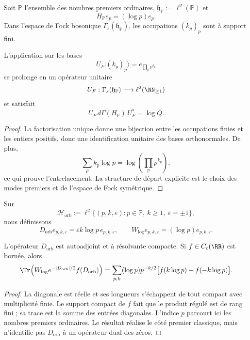 Soit \(\mathbb P\) l'ensemble des nombres premiers ordinaires,
\(\mathfrak h_{\mathbb P}:=\ell^2(\mathbb P)\) et
\[
 H_{\mathbb P}e_p=(\log p)e_p.
\]
Dans l'espace de Fock bosonique \(\Gamma_s(\mathfrak h_{\mathbb P})\), les occupations
\((k_p)_p\) sont à support fini.

\begin{theorem}
\label{pf84:C08}
L'application sur les bases
\[
 U_F\lvert(k_p)_p\rangle=e_{\prod_pp^{k_p}}
\]
se prolonge en un opérateur unitaire
\[
 U_F:\Gamma_s(\mathfrak h_{\mathbb P})
 \longrightarrow\ell^2(\NN_{\ge1})
\]
et satisfait
\[
 U_F\,d\Gamma(H_{\mathbb P})\,U_F^*=\log Q.
\]
\end{theorem}

\begin{proof}
La factorisation unique donne une bijection entre les occupations finies et les entiers
positifs, donc une identification unitaire des bases orthonormales.
De plus,
\[
 \sum_pk_p\log p=\log\!\left(\prod_pp^{k_p}\right),
\]
ce qui prouve l'entrelacement. La structure de départ explicite est le
choix des modes premiers et de l'espace de Fock symétrique.
\end{proof}

Sur
\[
 \mathcal H_{\mathrm{orb}}
 :=\ell^2\{(p,k,\varepsilon):
 p\in\mathbb P,\ k\ge1,\ \varepsilon=\pm1\},
\]
nous définissons
\[
 D_{\mathrm{orb}}e_{p,k,\varepsilon}
 =\varepsilon k\log p\,e_{p,k,\varepsilon},
 \qquad
 W_{\log}e_{p,k,\varepsilon}
 =(\log p)e_{p,k,\varepsilon}.
\]

\begin{proposition}
\label{pf84:C09}
L'opérateur \(D_{\mathrm{orb}}\) est autoadjoint et à résolvante compacte. Si
\(f\in C_c(\RR)\) est bornée, alors
\[
 \Tr\!\left(
 W_{\log}e^{-|D_{\mathrm{orb}}|/2}f(D_{\mathrm{orb}})
 \right)
 =
 \sum_{p,k}(\log p)p^{-k/2}
 \bigl[f(k\log p)+f(-k\log p)\bigr].
\]
\end{proposition}

\begin{proof}
La diagonale est réelle et ses longueurs s'échappent de tout compact avec
multiplicité finie. Le support compact de \(f\) fait que le produit
régulé est de rang fini ; sa trace est la somme des entrées diagonales.
L'indice \(p\) parcourt ici les nombres premiers ordinaires. Le résultat réalise le
côté premier classique, mais n'identifie pas \(D_{\mathrm{orb}}\) à un opérateur
dual des zéros.
\end{proof}

